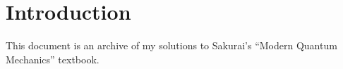 \section{Introduction}

This document is an archive of my solutions to Sakurai's ``Modern Quantum Mechanics'' textbook.

